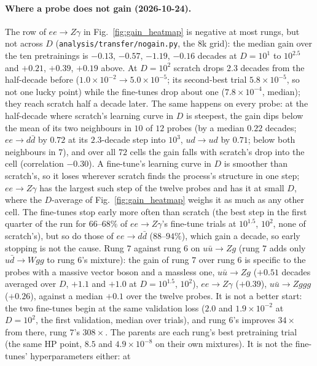 \documentclass[11pt]{article}
\newcommand{\code}[1]{\texttt{#1}}
\begin{document}
\paragraph{Where a probe does not gain (2026-10-24).}\label{par:nogain} The row of $ee\to Z\gamma$ in
Fig.~\ref{fig:gain_heatmap} is negative at most rungs, but not across $D$ (\code{analysis/transfer/nogain.py}, the 8k
grid): the median gain over the ten pretrainings is $-0.13$, $-0.57$, $-1.19$, $-0.16$ decades at $D=10^{1}$ to
$10^{2.5}$ and $+0.21$, $+0.39$, $+0.19$ above. At $D=10^2$ scratch drops $2.3$ decades from the half-decade before
($1.0\times10^{-2}\to5.0\times10^{-5}$; its second-best trial $5.8\times10^{-5}$, so not one lucky point) while the
fine-tunes drop about one ($7.8\times10^{-4}$, median); they reach scratch half a decade later. The same happens on every
probe: at the half-decade where scratch's learning curve in $D$ is steepest, the gain dips below the mean of its two
neighbours in $10$ of $12$ probes (by a median $0.22$ decades; $ee\to d\bar d$ by $0.72$ at its $2.3$-decade step into
$10^3$, $ud\to ud$ by $0.71$; below both neighbours in $7$), and over all $72$ cells the gain falls with scratch's drop into the cell (correlation $-0.30$). A fine-tune's
learning curve in $D$ is smoother than scratch's, so it loses wherever scratch finds the process's structure in one
step; $ee\to Z\gamma$ has the largest such step of the twelve probes and has it at small $D$, where the $D$-average of
Fig.~\ref{fig:gain_heatmap} weighs it as much as any other cell. The fine-tunes stop early more often than scratch
(the best step in the first quarter of the run for $66$--$68\%$ of $ee\to Z\gamma$'s fine-tune trials at $10^{1.5}$,
$10^2$, none of scratch's), but so do those of $ee\to d\bar d$ ($88$--$94\%$), which gain a decade, so early stopping is
not the cause.
Rung $7$ against rung $6$ on $u\bar u\to Zg$ (rung $7$ adds only $u\bar d\to Wgg$ to rung $6$'s mixture): the gain
of rung $7$ over rung $6$ is specific to the probes with a massive vector boson and a massless one, $u\bar u\to Zg$
($+0.51$ decades averaged over $D$, $+1.1$ and $+1.0$ at $D=10^{1.5}$, $10^2$), $ee\to Z\gamma$ ($+0.39$), $u\bar u\to Zggg$
($+0.26$), against a median $+0.1$ over the twelve probes. It is not a better start: the two fine-tunes begin at the
same validation loss ($2.0$ and $1.9\times10^{-2}$ at $D=10^2$, the first validation, median over trials), and rung $6$'s
improves $34\times$ from there, rung $7$'s $308\times$. The parents are each rung's best pretraining trial (the same HP
point, $8.5$ and $4.9\times10^{-8}$ on their own mixtures). It is not the fine-tunes' hyperparameters either: at
\end{document}
